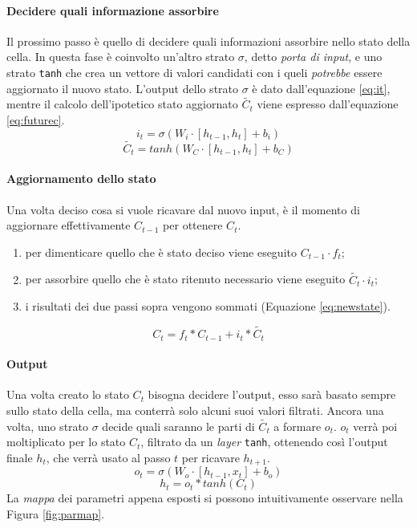 \documentclass[twoside,twocolumn,10pt]{extarticle}
\theoremstyle{definition}
\begin{document}
		\paragraph{Decidere quali informazione assorbire}
			Il prossimo passo è quello di decidere quali informazioni assorbire nello stato della cella. In questa fase è coinvolto un'altro strato $\sigma$, detto \textit{porta di input}, e uno strato \texttt{tanh} che crea un vettore di valori candidati con i queli \textit{potrebbe} essere aggiornato il nuovo stato. L'output dello strato $\sigma$ è dato dall'equazione \ref{eq:it}, mentre il calcolo dell'ipotetico stato aggiornato $\tilde{C_t}$ viene espresso dall'equazione \ref{eq:futurec}.
			\begin{equation}\label{eq:it}
				i_t = \sigma(W_i \cdot [h_{t - 1}, h_t] + b_i)
			\end{equation}
			\begin{equation}\label{eq:futurec}
				\tilde{C_t} = tanh(W_C \cdot [h_{t - 1}, h_t] + b_C)
			\end{equation}
			
		\paragraph{Aggiornamento dello stato}
			Una volta deciso cosa si vuole ricavare dal nuovo input, è il momento di aggiornare effettivamente $C_{t - 1}$ per ottenere $C_t$.
			\begin{enumerate}
				\item per dimenticare quello che è stato deciso viene eseguito $C_{t - 1} \cdot f_t$;
				\item per assorbire quello che è stato ritenuto necessario viene eseguito $\tilde{C_t} \cdot i_t$;
				\item i risultati dei due passi sopra vengono sommati (Equazione \ref{eq:newstate}).
			\end{enumerate}
			\begin{equation}\label{eq:newstate}
				C_t = f_t * C_{t - 1} + i_t * \tilde{C_t}
			\end{equation}
		
		\paragraph{Output}
			Una volta creato lo stato $C_t$ bisogna decidere l'output, esso sarà basato sempre sullo stato della cella, ma conterrà solo alcuni suoi valori filtrati. Ancora una volta, uno strato $\sigma$ decide quali saranno le parti di $\tilde{C_t}$ a formare $o_t$. $o_t$ verrà poi moltiplicato per lo stato $C_t$, filtrato da un \textit{layer} \texttt{tanh}, ottenendo così l'output finale $h_t$, che verrà usato al passo $t$ per ricavare $h_{t + 1}$.
			\begin{equation}
				o_t = \sigma(W_o \cdot [h_{t - 1}, x_t] + b_o)
			\end{equation}
			\begin{equation}
				h_t = o_t * tanh(C_t)
			\end{equation}
			La \textit{mappa} dei parametri appena esposti si possono intuitivamente osservare nella Figura \ref{fig:parmap}.
		
\end{document}
